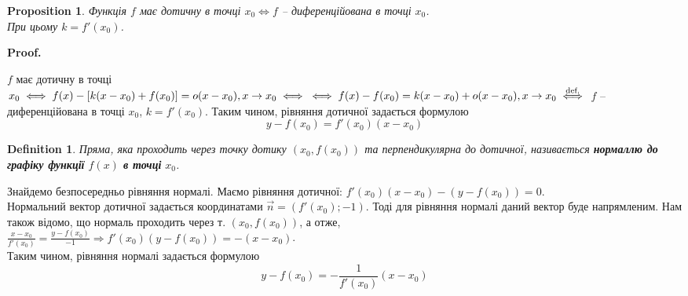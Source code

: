 \documentclass[a4paper, 14pt]{article}
\makeatletter
\def\qed{$\blacksquare$}
\theoremstyle{theoremdd}
\theoremstyle{theoremdd}
\newtheorem{definition}[theorem]{Definition}
\theoremstyle{theoremdd}
\theoremstyle{theoremdd}
\theoremstyle{theoremdd}
\newtheorem{proposition}[theorem]{Proposition}
\theoremstyle{theoremdd}
\theoremstyle{theoremdd}
\theoremstyle{theoremdd}
\renewenvironment{proof}[1][Proof.\\]{\par
\pushQED{\hfill \qed}%
\normalfont \topsep6\p@\@plus6\p@\relax
\trivlist
\item\relax
{\bfseries
#1\@addpunct{.}}\hspace\labelsep\ignorespaces
}{%
\popQED\endtrivlist\@endpefalse
}
\makeatother
\begin{document}
\begin{proposition}
Функція $f$ має дотичну в точці $x_0 \iff f$ -- диференційована в точці $x_0$. \\ При цьому $k = f'(x_0)$.
\end{proposition}

\begin{proof}
$f$ має дотичну в точці $x_0 \iff f(x) - [k(x-x_0)+f(x_0)] = o(x-x_0), x \to x_0 \iff \\ \iff f(x)-f(x_0) = k(x-x_0) + o(x-x_0), x \to x_0 \overset{\textrm{def.}}{\iff}$ $f$ -- диференційована в точці $x_0$, $k=f'(x_0)$.
\end{proof}
Таким чином, рівняння дотичної задається формулою $$y - f(x_0) = f'(x_0)(x-x_0)$$

\iffalse
Є ще інше пояснення дотичної:\\
Нехай є фіксована точка $(x_0,f(x_0))$ та точка $(x^*,f(x^*))$. Через ці дві точки проведемо пряму - її ще називають \textbf{січною}. Маємо таке рівняння:\\
$\dfrac{x-x_0}{x^*-x_0} = \dfrac{y-f(x_0)}{f(x^*) - f(x_0)} \Rightarrow \dfrac{f(x^*)-f(x_0)}{x^*-x_0}(x-x_0) = y - f(x_0)$.\\
Ну а далі спрямуємо $x^* \to x_0$. І якщо функція $f$ - диференційована в т. $x_0$, то одразу маємо\\
$f - f(x_0) = f'(x_0)(x-x_0)$.\\
Що й хотіли.
\fi

\begin{definition}
Пряма, яка проходить через точку дотику $(x_0, f(x_0))$ та перпендикулярна до дотичної, називається \textbf{нормаллю до графіку функції} $f(x)$ \textbf{в точці} $x_0$.
\end{definition}

Знайдемо безпосередньо рівняння нормалі. Маємо рівняння дотичної:
$f'(x_0)(x-x_0) - (y-f(x_0)) = 0$.\\
Нормальний вектор дотичної задається координатами $\vec{n} = (f'(x_0); -1)$. Тоді для рівняння нормалі даний вектор буде напрямленим. Нам також відомо, що нормаль проходить через т. $(x_0,f(x_0))$, а отже,\\
$\displaystyle \frac{x-x_0}{f'(x_0)} = \frac{y-f(x_0)}{-1} \Rightarrow f'(x_0)(y-f(x_0)) = -(x-x_0)$.\\
Таким чином, рівняння нормалі задається формулою $$y-f(x_0) = \displaystyle -\frac{1}{f'(x_0)}(x-x_0)$$
\\ \iffalse %
\begin{figure}[H]
\centering
\begin{tikzpicture}
\draw[thick, ->] (-3,0)--(4,0) node[below = 2pt] {$x$};
\draw[thick, ->] (0,-2)--(0,4) node[left = 2pt] {$y$};
\draw[thick] plot [smooth, tension=1] coordinates { (-2,1) (-1,2) (1,1) (3,3.5) } node[align=center, below, left =4pt] {$f(x)$};
\draw[thick, red] (-1,1/3)--(4,2);
\draw[thick, blue] (0.5,2.5)--(2,-2);
\filldraw (1,1) circle (2pt) node[align=center, below = 4pt, right = 2pt] {$(x_0, f(x_0))$};
\end{tikzpicture}
	\caption*{Графік функції, до якої проведена дотична (червоний) та нормаль (синій).}
\end{figure}
\fi %
\end{document}
